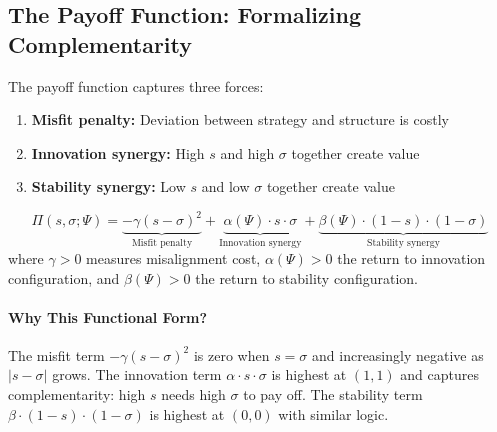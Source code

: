 \subsection{The Payoff Function: Formalizing Complementarity}

The payoff function captures three forces:
\begin{enumerate}
  \item \textbf{Misfit penalty:} Deviation between strategy and structure is costly
  \item \textbf{Innovation synergy:} High $s$ and high $\sigma$ together create value
  \item \textbf{Stability synergy:} Low $s$ and low $\sigma$ together create value
\end{enumerate}

\begin{definition}
\begin{equation}
  \Pi(s, \sigma; \Psi) = \underbrace{-\gamma (s - \sigma)^2}_{\text{Misfit penalty}}
                        + \underbrace{\alpha(\Psi) \cdot s \cdot \sigma}_{\text{Innovation synergy}}
                        + \underbrace{\beta(\Psi) \cdot (1-s) \cdot (1-\sigma)}_{\text{Stability synergy}}
  \label{eq:payoff}
\end{equation}
where $\gamma > 0$ measures misalignment cost, $\alpha(\Psi) > 0$ the return to innovation configuration,
and $\beta(\Psi) > 0$ the return to stability configuration.
\end{definition}

\paragraph{Why This Functional Form?}
The misfit term $-\gamma(s - \sigma)^2$ is zero when $s = \sigma$ and increasingly negative as $|s - \sigma|$ grows.
The innovation term $\alpha \cdot s \cdot \sigma$ is highest at $(1, 1)$ and captures complementarity: high $s$ needs high $\sigma$ to pay off.
The stability term $\beta \cdot (1-s) \cdot (1-\sigma)$ is highest at $(0, 0)$ with similar logic.

